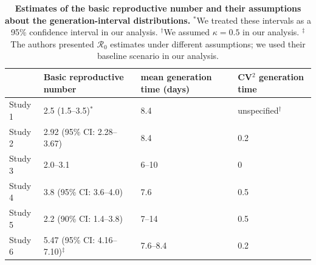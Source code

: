 \documentclass[12pt]{article}
\begin{document}
\begin{table}[t]
\begin{center}
\footnotesize
\begin{tabular}{l|l|l|l}
 & Basic reproductive number & mean generation time (days) & CV$^2$ generation time \\
\hline
Study 1 & 2.5 (1.5--3.5)$^\ast$ & 8.4 & unspecified$^\dagger$ \\
\hline
Study 2 & 2.92 (95\% CI: 2.28--3.67) & 8.4 & 0.2 \\
\hline
Study 3 & 2.0--3.1 & 6--10 & 0 \\
\hline
Study 4 & 3.8 (95\% CI: 3.6--4.0) & 7.6 & 0.5 \\
\hline
Study 5 & 2.2 (90\% CI: 1.4--3.8) & 7--14 & 0.5\\
\hline
Study 6 & 5.47 (95\% CI: 4.16--7.10)$^\ddagger$ & 7.6--8.4 & 0.2
\end{tabular}
\end{center}
\caption{
\textbf{Estimates of the basic reproductive number and their assumptions about the generation-interval distributions.}
$^\ast$We treated these intervals as a 95\% confidence interval in our analysis.
$^\dagger$We assumed $\kappa = 0.5$ in our analysis.
$^\ddagger$The authors presented $\mathcal R_0$ estimates under different assumptions; we used their baseline scenario in our analysis.
}
\end{table}
\end{document}
